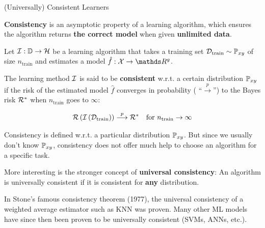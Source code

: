 \documentclass[11pt,compress,t,notes=noshow, xcolor=table]{beamer}
\begin{document}
\begin{vbframe}{(Universally) Consistent Learners }

\textbf{Consistency} is an asymptotic property of a learning algorithm, which ensures the algorithm returns \textbf{the correct model} when given \textbf{unlimited data}.

\lz 

Let $\mathcal{I}:\mathbb{D} \to \mathcal{H}$ be a learning algorithm that takes a training set $\mathcal{D}_{\text{train}} \sim \mathbb{P}_{xy}$ of size $n_\text{train}$ and estimates a model $\hat f: \Xspace \to \R^g$. 

\lz 

The learning method $\mathcal{I}$ is said to be \textbf{consistent} w.r.t. a certain distribution $\mathbb{P}_{xy}$ if the risk of the estimated model $\hat f$ converges in probability ( \enquote{$\overset{p}{\longrightarrow}$}) to the Bayes risk $\mathcal{R}^\ast$ when $n_\text{train}$ goes to $\infty$: 

$$
	\mathcal{R}\left(\mathcal{I}\left(\mathcal{D}_{\text{train}}\right)\right) \overset{p}{\longrightarrow} \mathcal{R}^\ast \quad \text{for } n_\text{train} \to \infty
$$

\vfill




\framebreak 

Consistency is defined w.r.t. a particular distribution $\mathbb{P}_{xy}$.
But since we usually don't know $\mathbb{P}_{xy}$, consistency
does not offer much help to choose an algorithm for a specific task. 

\lz 

More interesting is the stronger concept of \textbf{universal consistency}: An algorithm is universally consistent if it is consistent for \textbf{any} distribution. 

\lz 

In Stone's famous consistency theorem (1977), the universal consistency of a weighted average estimator such as KNN was proven. Many other ML models have since then been proven to be universally consistent (SVMs, ANNs, etc.).



\end{vbframe}



\end{document}
